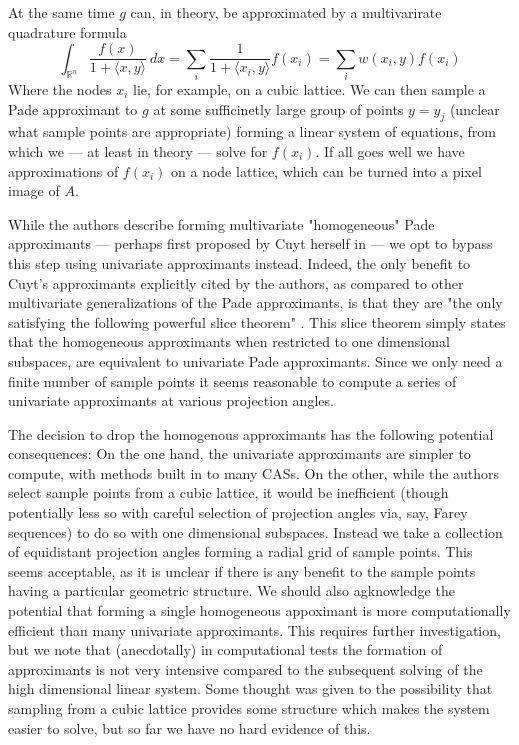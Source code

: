 \documentclass{amsart}
\theoremstyle{remark}
\numberwithin{equation}{section}
\newcommand{\RR}{\mathbb{R}}
\begin{document}
At the same time $g$ can, in theory, be approximated by a multivarirate quadrature formula
\[
    \int_{\RR^n} \frac{f(x)}{1 + \langle x, y\rangle} ~dx
    = \sum_{i} \frac1{1+\langle x_i, y\rangle} f(x_i)
    = \sum_{i} w(x_i, y) f(x_i)
\]
Where the nodes $x_i$ lie, for example, on a cubic lattice. We can then sample a Pade approximant to $g$ at some sufficinetly large group of points $y = y_j$ (unclear what sample points are appropriate) forming a linear system of equations, from which we — at least in theory — solve for $f(x_i)$. If all goes well we have approximations of $f(x_i)$ on a node lattice, which can be turned into a pixel image of $A$.

While the authors describe forming multivariate "homogeneous" Pade approximants — perhaps first proposed by Cuyt herself in \cite{Cuyt84} — we opt to bypass this step using univariate approximants instead. Indeed, the only benefit to Cuyt's approximants explicitly cited by the authors, as compared to other multivariate generalizations of the Pade approximants, is that they are "the only satisfying the following powerful slice theorem" \cite{Cuyt05}. This slice theorem simply states that the homogeneous approximants when restricted to one dimensional subspaces, are equivalent to univariate Pade approximants. Since we only need a finite number of sample points it seems reasonable to compute a series of univariate approximants at various projection angles.

The decision to drop the homogenous approximants has the following potential consequences: On the one hand, the univariate approximants are simpler to compute, with methods built in to many CASs. On the other, while the authors select sample points from a cubic lattice, it would be inefficient (though potentially less so with careful selection of projection angles via, say, Farey sequences) to do so with one dimensional subspaces. Instead we take a collection of equidistant projection angles forming a radial grid of sample points. This seems acceptable, as it is unclear if there is any benefit to the sample points having a particular geometric structure. We should also agknowledge the potential that forming a single homogeneous appoximant is more computationally efficient than many univariate approximants. This requires further investigation, but we note that (anecdotally) in computational tests the formation of approximants is not very intensive compared to the subsequent solving of the high dimensional linear system. Some thought was given to the possibility that sampling from a cubic lattice provides some structure which makes the system easier to solve, but so far we have no hard evidence of this.
\end{document}
